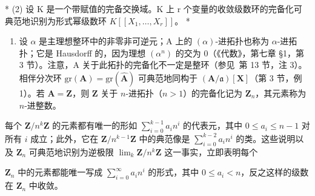 * (2) 设 K 是一个带赋值的完备交换域。K 上 r 个变量的收敛级数环的完备化可典范地识别为形式幂级数环 \(K[[X_{1},\ldots,X_{r}]]\)。 *

\begin{enumerate}
\def\labelenumi{(\arabic{enumi})}
\setcounter{enumi}{2}
\tightlist
\item
  设 \(\alpha\) 是主理想整环中的非零非可逆元；A 上的 \((\alpha)\)-进拓扑也称为 \(\alpha\)-进拓扑；它是 Hausdorff 的，因为理想 \((\alpha^n)\) 的交为 0（《代数》，第七章 §1，第 3 节）。注意，A 关于此拓扑的完备化不一定是整环（参见~第 13 节，注 3）。相伴分次环 \(\mathrm{gr}(\mathbf{A}) = \mathrm{gr}(\hat{\mathbf{A}})\) 可典范地同构于 \((\mathbf{A}/\mathfrak{a})[\mathbf{X}]\)（第 3 节，例 1）。若 \(\mathbf{A} = \mathbf{Z}\)，则 \(\mathbf{Z}\) 关于 \(n\)-进拓扑（\(n > 1\)）的完备化记为 \(\mathbf{Z}_n\)，其元素称为 \(n\)-进整数。
\end{enumerate}

每个 \(\mathbf{Z} / n^k\mathbf{Z}\) 的元素都有唯一的形如 \(\sum_{i=0}^{k-1} a_i n^i\) 的代表元，其中 \(0 \leqslant a_i \leqslant n - 1\) 对所有 \(i\) 成立；此外，它在 \(\mathbf{Z} / n^{k-1}\mathbf{Z}\) 中的典范像是 \(\sum_{i=0}^{k-2} a_i n^i\) 的类。这些说明以及 \(\mathbf{Z}_n\) 可典范地识别为逆极限 \(\lim_{k} \mathbf{Z}/n^k \mathbf{Z}\) 这一事实，立即表明每个

\(\mathbf{Z}_n\) 中的元素都能唯一写成 \(\sum_{i=0}^{\infty} a_i n^i\) 的形式，其中 \(0 \leqslant a_i < n\)，反之这样的级数在 \(\mathbf{Z}_n\) 中收敛。
\relax{}
